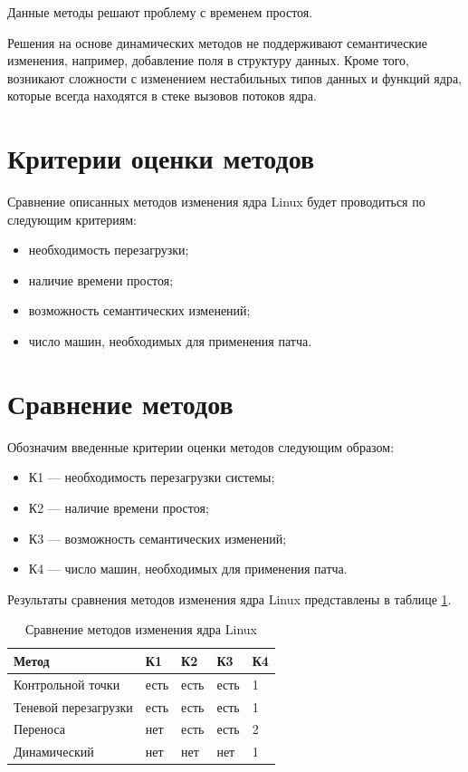 Данные методы решают проблему с временем простоя.

Решения на основе динамических методов не поддерживают семантические изменения, например, добавление поля в структуру данных. Кроме того, возникают сложности с изменением нестабильных типов данных и функций ядра, которые всегда находятся в стеке вызовов потоков ядра.

\section{Критерии оценки методов}

Сравнение описанных методов изменения ядра Linux будет проводиться по следующим критериям:

\begin{itemize}
	\item необходимость перезагрузки;
	\item наличие времени простоя;
	\item возможность семантических изменений;
	\item число машин, необходимых для применения патча.
\end{itemize}

\section{Сравнение методов}

Обозначим введенные критерии оценки методов следующим образом:

\begin{itemize}
	\item К1 --- необходимость перезагрузки системы;
	\item К2 --- наличие времени простоя;
	\item К3 --- возможность семантических изменений;
	\item К4 --- число машин, необходимых для применения патча.
\end{itemize}

Результаты сравнения методов изменения ядра Linux представлены в таблице \ref{tab:comparison}.

\begin{table}[h]
    \caption{Сравнение методов изменения ядра Linux}
    \begin{center}
        \begin{tabular}{|l|l|l|l|l|}
            \hline
            Метод & К1 & К2 & К3 & К4 \\ \hline
            Контрольной точки & есть & есть & есть & 1 \\ \hline
            Теневой перезагрузки & есть & есть & есть & 1 \\ \hline
            Переноса & нет & есть & есть & 2 \\ \hline
            Динамический & нет & нет & нет & 1 \\ \hline
        \end{tabular}
    \end{center}
    \label{tab:comparison}
\end{table}

